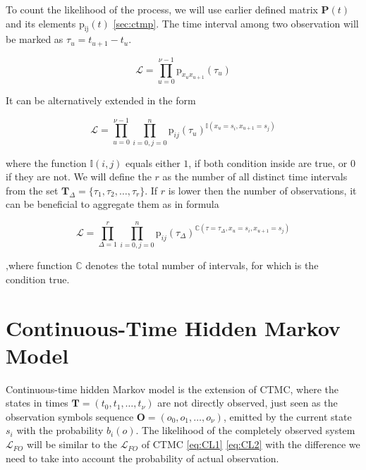 \documentclass[thesis=M,english]{FITthesis}[2012/10/20]
\newcommand{\matr}[1]{\mathbf{#1}}
\begin{document}
To count the likelihood of the process, we will use earlier defined matrix $\matr{P}(t)$ and its elements $\mathrm{p_{ij}}(t)$ \ref{sec:ctmp}. The time interval among two observation will be marked as  $\tau_u = t_{u+1} - t_u$.    

\begin{equation}
 \mathcal{L} = \prod_{u=0}^{\nu-1} \mathrm{p}_{x_u x_{u+1}}(\tau_u) 
\end{equation}

It can be alternatively extended in the form

\begin{equation}
 \mathcal{L} = \prod_{u=0}^{\nu-1} \prod_{i=0,j=0}^{n}  \mathrm{p}_{ij}(\tau_u)^{\mathbb{I}( x_u = s_i, x_{u+1} = s_j )} 
\end{equation}

where the function $\mathbb{I}(i,j)$ equals either $1$, if both condition inside are true, or $0$ if they are not. 
We will define the $r$ as the number of all distinct time intervals from the set $ \matr{T}_{\Delta} = \{ \tau_1,\tau_2,\dots,\tau_r\}$. If $r$ is lower then the number of observations, it can be beneficial to aggregate them as in formula

\begin{equation}\label{eq:CTL}
 \mathcal{L} = \prod_{\Delta = 1}^{r} \prod_{i=0,j=0}^{n}  \mathrm{p}_{ij}(\tau_{\Delta})^{\mathbb{C}( \tau=\tau_{\Delta}, x_u = s_i, x_{u+1} = s_j )} 
\end{equation}

,where function $\mathbb{C}$ denotes the total number of intervals, for which is the condition true.
    

\section{Continuous-Time Hidden Markov Model}



Continuous-time hidden Markov model is the extension of CTMC, where the states in times $\matr{T} = ( t_0, t_1, \dots, t_{\nu} )$ are not directly observed, just seen as the observation symbols sequence $\matr{O} = (  o_0, o_1, \dots, o_{\nu} )$, emitted by the current state $s_i$ with the probability $b_i(o)$.
The likelihood of the completely observed system  $\mathcal{L}_{FO}$ will be similar to the $\mathcal{L}_{FO}$ of CTMC \eqref{eq:CL1} \eqref{eq:CL2} with the difference we need to take into account the probability of actual observation.
\end{document}
